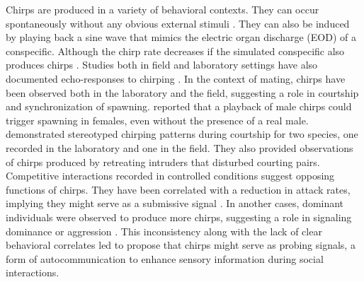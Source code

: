 Chirps are produced in a variety of behavioral contexts. They can occur
spontaneously without any obvious external stimuli
\parencite{englerSpontaneousModulationsElectric2000a}. They can also be induced
by playing back a sine wave that mimics the electric organ discharge (EOD) of a
conspecific. Although the chirp rate decreases if the simulated conspecific
also produces chirps \parencite{walzNeuroethologyElectrocommunicationHow2013}.
Studies both in field and laboratory settings have also documented
echo-responses to chirping
\parencite{henningerStatisticsNaturalCommunication2018,
hupeEffectDifferenceFrequency2008, gamasalgadoEchoResponseChirping2011}. In the
context of mating, chirps have been observed both in the laboratory and the
field, suggesting a role in courtship and synchronization of spawning.
\textcite{hagedornCourtSparkElectric1985a} reported that a playback of male
chirps could trigger spawning in females, even without the presence of a real
male. \textcite{henningerStatisticsNaturalCommunication2018} demonstrated
stereotyped chirping patterns during courtship for two species, one recorded in
the laboratory and one in the field. They also provided observations of
chirps produced by retreating intruders that disturbed courting pairs.
Competitive interactions recorded in controlled conditions suggest opposing
functions of chirps. They have been correlated with a reduction in attack
rates, implying they might serve as a submissive signal
\parencite{hupeElectrocommunicationSpeciesWeakly2012}. In another cases,
dominant individuals were observed to produce more chirps, suggesting a role in
signaling dominance or aggression
\parencite{triefenbachChangesSignallingAgonistic2008b}. This inconsistency
along with the lack of clear behavioral correlates led
\textcite{obotiWhyBrownGhost2023} to propose that chirps might serve as probing
signals, a form of autocommunication to enhance sensory information during
social interactions.

